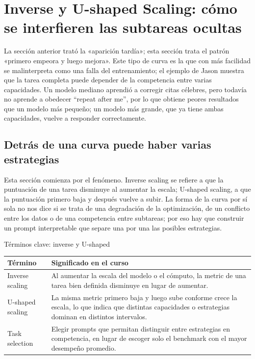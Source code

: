 \section{Inverse y U-shaped Scaling: cómo se interfieren las subtareas ocultas}

La sección anterior trató la «aparición tardía»; esta sección trata el patrón «primero empeora y luego mejora». Este tipo de curva es la que con más facilidad se malinterpreta como una falla del entrenamiento; el ejemplo de Jason muestra que la tarea completa puede depender de la competencia entre varias capacidades. Un modelo mediano aprendió a corregir citas célebres, pero todavía no aprende a obedecer ``repeat after me'', por lo que obtiene peores resultados que un modelo más pequeño; un modelo más grande, que ya tiene ambas capacidades, vuelve a responder correctamente.

\subsection{Detrás de una curva puede haber varias estrategias}

Esta sección comienza por el fenómeno. Inverse scaling se refiere a que la puntuación de una tarea disminuye al aumentar la escala; U-shaped scaling, a que la puntuación primero baja y después vuelve a subir. La forma de la curva por sí sola no nos dice si se trata de una degradación de la optimización, de un conflicto entre los datos o de una competencia entre subtareas; por eso hay que construir un prompt interpretable que separe una por una las posibles estrategias.


\begin{knowledgebox}{Términos clave: inverse y U-shaped}
\begin{tabularx}{\textwidth}{L{0.23\textwidth} X}
\toprule
Término & Significado en el curso \\
\midrule
Inverse scaling & Al aumentar la escala del modelo o el cómputo, la metric de una tarea bien definida disminuye en lugar de aumentar. \\
U-shaped scaling & La misma metric primero baja y luego sube conforme crece la escala, lo que indica que distintas capacidades o estrategias dominan en distintos intervalos. \\
Task selection & Elegir prompts que permitan distinguir entre estrategias en competencia, en lugar de escoger solo el benchmark con el mayor desempeño promedio. \\
\bottomrule
\end{tabularx}
\end{knowledgebox}

